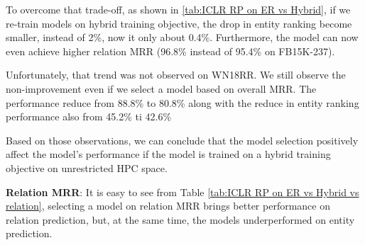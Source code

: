 To overcome that trade-off, as shown in \ref{tab:ICLR RP on ER vs Hybrid}, if we re-train models on hybrid training objective, the drop in entity ranking become smaller, instead of 2\%, now it only about 0.4\%. Furthermore, the model can now even achieve higher relation MRR (96.8\% instead of 95.4\% on FB15K-237). 

Unfortunately, that trend was not observed on WN18RR. We still observe the non-improvement even if we select a model based on overall MRR. The performance reduce from 88.8\% to 80.8\% along with the reduce in entity ranking performance also from 45.2\% ti 42.6\%

Based on those observations, we can conclude that the model selection positively affect the model's performance if the model is trained on a hybrid training objective on unrestricted HPC space. 
\newline

\noindent\textbf{Relation MRR}: It is easy to see from Table \ref{tab:ICLR RP on ER vs Hybrid vs relation}, selecting a model on relation MRR brings better performance on relation prediction, but, at the same time, the models underperformed on entity prediction.  

